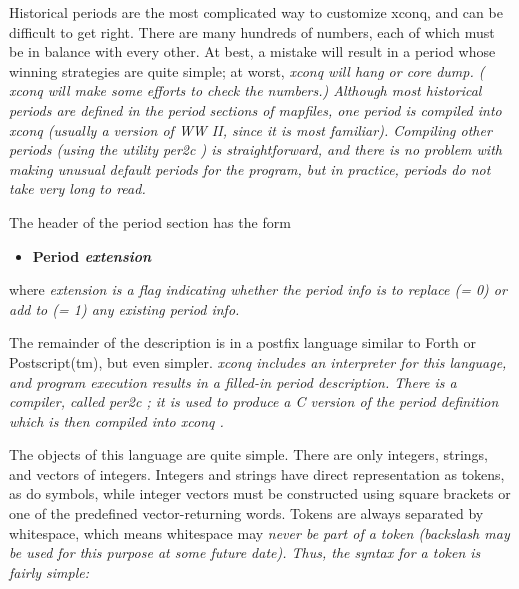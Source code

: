 

%
%
\par\noindent
Historical periods are the most complicated way to customize xconq,
and can be difficult to get right.
There are many hundreds of numbers,
each of which must be in balance with every other.  At best, a mistake will
result in a period whose winning strategies are quite simple;  at worst,
%
\it xconq \rm%
will hang or core dump.
(%
\it xconq \rm%
will make some efforts to check the numbers.)
Although most historical periods are defined 
in the period sections of mapfiles,
one period is compiled into %
\it xconq \rm%
(usually a version of WW II, since it is most familiar).
Compiling other periods (using the utility %
\it per2c\rm%
) is straightforward,
and there is no problem with making unusual default periods for the
program, but in practice, periods do not take very long to read.
\par\noindent
The header of the period section has the form
\begin{itemize}
\item
%
\bf Period %
\it extension %
\rm \end{itemize}\par\noindent
where %
\it extension \rm%
is a flag indicating whether the period info
is to replace (= 0) or add to (= 1) any existing period info.
\par\noindent
The remainder of the description is in a postfix language similar
to Forth or Postscript(tm), but even simpler.
%
\it xconq \rm%
includes an interpreter
for this language, and program execution results in a filled-in period
description.  There is a compiler, called %
\it per2c\rm%
; it is used
to produce a C version of the period definition which is then
compiled into %
\it xconq\rm%
.
\par\noindent
The objects of this language are quite simple.  There are only integers,
strings, and vectors of integers.  Integers and strings have direct
representation as tokens, as do symbols, while integer vectors must be
constructed using square brackets or one of the predefined vector-returning
words.  Tokens are always separated by whitespace, which means whitespace
may %
\it never \rm%
be part of a token (backslash may be used for this purpose
at some future date).
Thus, the syntax for a token is fairly simple:
